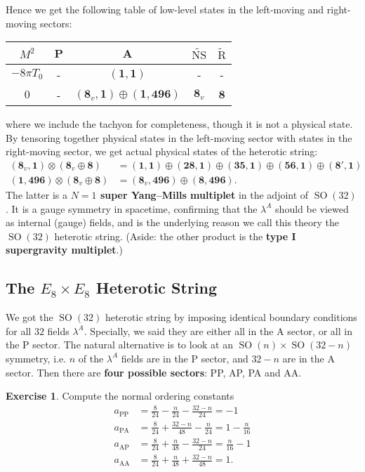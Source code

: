 \documentclass{report}
\theoremstyle{plain}
\theoremstyle{definition}
\newtheorem{exercise}{Exercise}[section]
\theoremstyle{remark}
\DeclareMathOperator{\SO}{SO}
\newcommand{\rep}[1]{\mathbf{#1}}
\newcommand{\NS}{\mathrm{NS}}
\newcommand{\R}{\mathrm{R}}
\begin{document}
Hence we get the following table of low-level states in the
left-moving and right-moving sectors:
\begin{center}
\begin{tabular}{ccccc}
  $M^2$ & P & A & $\tilde{\NS}$ & $\tilde{\R}$ \\ \hline
  $-8\pi T_0$ & - & $(\rep{1}, \rep{1})$ & - & - \\
  $0$ & - & $(\rep{8}_v, \rep{1}) \oplus (\rep{1}, \rep{496})$ & $\rep{8}_v$ & $\rep{8}$
\end{tabular}
\end{center}
where we include the tachyon for completeness, though it is not a
physical state. By tensoring together physical states in the
left-moving sector with states in the right-moving sector, we get
actual physical states of the heterotic string:
\begin{align*}
  (\rep{8}_v, \rep{1}) \otimes (\rep{8}_v \oplus \rep{8})
  &= (\rep{1}, \rep{1}) \oplus (\rep{28}, \rep{1}) \oplus (\rep{35}, \rep{1}) \oplus (\rep{56}, \rep{1}) \oplus (\rep{8}', \rep{1}) \\
  (\rep{1}, \rep{496}) \otimes (\rep{8}_v \oplus \rep{8})
  &= (\rep{8}_v, \rep{496}) \oplus (\rep{8}, \rep{496}).
\end{align*}
The latter is a {\bf $N=1$ super Yang--Mills multiplet} in the adjoint
of $\SO(32)$. It is a gauge symmetry in spacetime, confirming that the
$\lambda^A$ should be viewed as internal (gauge) fields, and is the
underlying reason we call this theory the $\SO(32)$ heterotic string.
(Aside: the other product is the {\bf type I supergravity multiplet}.)

\subsection{The $E_8 \times E_8$ Heterotic String}

We got the $\SO(32)$ heterotic string by imposing identical boundary
conditions for all $32$ fields $\lambda^A$. Specially, we said they
are either all in the A sector, or all in the P sector. The natural
alternative is to look at an $\SO(n) \times \SO(32-n)$ symmetry, i.e.
$n$ of the $\lambda^A$ fields are in the P sector, and $32-n$ are in
the A sector. Then there are {\bf four possible sectors}: PP, AP, PA
and AA.

\begin{exercise}
  Compute the normal ordering constants
  \begin{align*}
    a_{\text{PP}} &= \frac{8}{24} - \frac{n}{24} - \frac{32 - n}{24} = -1 \\
    a_{\text{PA}} &= \frac{8}{24} + \frac{32 - n}{48} - \frac{n}{24} = 1 - \frac{n}{16} \\
    a_{\text{AP}} &= \frac{8}{24} + \frac{n}{48} - \frac{32 - n}{24} = \frac{n}{16} - 1 \\
    a_{\text{AA}} &= \frac{8}{24} + \frac{n}{48} + \frac{32 - n}{48} = 1.
  \end{align*}
\end{exercise}
\end{document}
